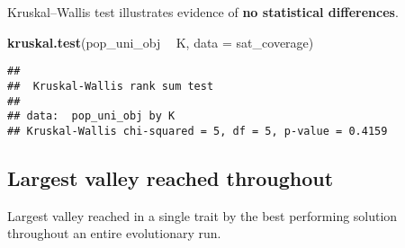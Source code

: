 \documentclass[]{book}
\newenvironment{Shaded}{\begin{snugshade}}{\end{snugshade}}
\newcommand{\DataTypeTok}[1]{\textcolor[rgb]{0.13,0.29,0.53}{#1}}
\newcommand{\KeywordTok}[1]{\textcolor[rgb]{0.13,0.29,0.53}{\textbf{#1}}}
\newcommand{\NormalTok}[1]{#1}
\newcommand{\OperatorTok}[1]{\textcolor[rgb]{0.81,0.36,0.00}{\textbf{#1}}}
\newcommand{\StringTok}[1]{\textcolor[rgb]{0.31,0.60,0.02}{#1}}
\begin{document}
Kruskal--Wallis test illustrates evidence of \textbf{no statistical differences}.

\begin{Shaded}
\begin{Highlighting}[]
\KeywordTok{kruskal.test}\NormalTok{(pop_uni_obj }\OperatorTok{~}\StringTok{ }\NormalTok{K, }\DataTypeTok{data =}\NormalTok{ sat_coverage)}
\end{Highlighting}
\end{Shaded}

\begin{verbatim}
## 
##  Kruskal-Wallis rank sum test
## 
## data:  pop_uni_obj by K
## Kruskal-Wallis chi-squared = 5, df = 5, p-value = 0.4159
\end{verbatim}

\hypertarget{largest-valley-reached-throughout-22}{%
\subsection{Largest valley reached throughout}\label{largest-valley-reached-throughout-22}}

Largest valley reached in a single trait by the best performing solution throughout an entire evolutionary run.
\end{document}
